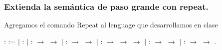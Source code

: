 \documentclass[12pt]{report}
\begin{document}
\subsubsection{Extienda la semántica de paso grande con repeat.}

\begin{coqdoccode}
\coqdocemptyline
\coqdocemptyline
\end{coqdoccode}
Agregamos el comando Repeat al lenguage que desarrollamos en clase \begin{coqdoccode}
\coqdocemptyline
\coqdocnoindent
{} :  :=\coqdoceol
\coqdocnoindent
\ensuremath{|}  : \coqdoceol
\coqdocnoindent
\ensuremath{|}  :  \ensuremath{\rightarrow}  \ensuremath{\rightarrow} \coqdoceol
\coqdocnoindent
\ensuremath{|}  :  \ensuremath{\rightarrow}  \ensuremath{\rightarrow} \coqdoceol
\coqdocnoindent
\ensuremath{|}  :   \ensuremath{\rightarrow}  \ensuremath{\rightarrow}  \ensuremath{\rightarrow} \coqdoceol
\coqdocnoindent
\ensuremath{|}  :  \ensuremath{\rightarrow}  \ensuremath{\rightarrow} \coqdoceol
\coqdocnoindent
\ensuremath{|}  :  \ensuremath{\rightarrow}  \ensuremath{\rightarrow} .\coqdoceol
\coqdocemptyline
\end{coqdoccode}
\end{document}
